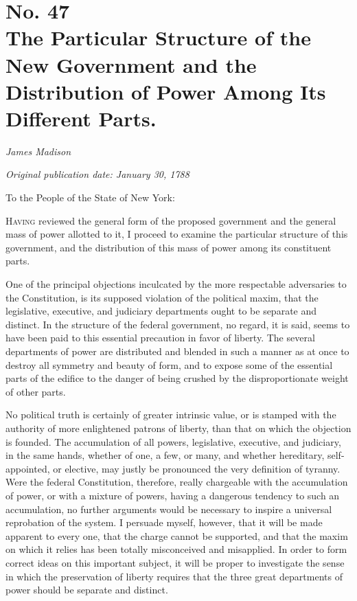 \chapter[No. 47: The Particular Structure of the New Government and the Distribution of Power Among Its Different Parts.]{No. 47\\ {\small The Particular Structure of the New Government and the Distribution of Power Among Its Different Parts.}}

\textit{James Madison}

\textit{Original publication date: January 30, 1788}
\vspace{1cm}

To the People of the State of New York:
\vspace{.4cm}

\textsc{Having} reviewed the general form of the proposed government and the general mass of power allotted to it, I proceed to examine the particular structure of this government, and the distribution of this mass of power among its constituent parts.

One of the principal objections inculcated by the more respectable adversaries to the Constitution, is its supposed violation of the political maxim, that the legislative, executive, and judiciary departments ought to be separate and distinct. 
In the structure of the federal government, no regard, it is said, seems to have been paid to this essential precaution in favor of liberty. 
The several departments of power are distributed and blended in such a manner as at once to destroy all symmetry and beauty of form, and to expose some of the essential parts of the edifice to the danger of being crushed by the disproportionate weight of other parts.

No political truth is certainly of greater intrinsic value, or is stamped with the authority of more enlightened patrons of liberty, than that on which the objection is founded. 
The accumulation of all powers, legislative, executive, and judiciary, in the same hands, whether of one, a few, or many, and whether hereditary, self-appointed, or elective, may justly be pronounced the very definition of tyranny. 
Were the federal Constitution, therefore, really chargeable with the accumulation of power, or with a mixture of powers, having a dangerous tendency to such an accumulation, no further arguments would be necessary to inspire a universal reprobation of the system. 
I persuade myself, however, that it will be made apparent to every one, that the charge cannot be supported, and that the maxim on which it relies has been totally misconceived and misapplied. 
In order to form correct ideas on this important subject, it will be proper to investigate the sense in which the preservation of liberty requires that the three great departments of power should be separate and distinct.

